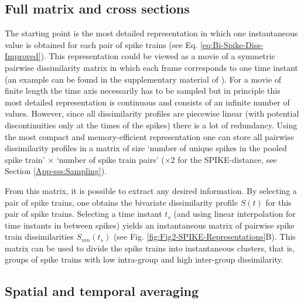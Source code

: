 \documentclass[10pt,twocolumn]{elsart5p}
\begin{document}
%

\subsection{\label{ss:Full-matrix-and-cross-sections} Full matrix and cross sections}

The starting point is the most detailed representation in which one instantaneous value is obtained for each pair of spike trains (see Eq. \ref{eq:Bi-Spike-Diss-Improved}). This representation could be viewed as a movie of a symmetric pairwise dissimilarity matrix in which each frame corresponds to one time instant (an example can be found in the supplementary material of \citep{Kreuz13}). For a movie of finite length the time axis necessarily has to be sampled but in principle this most detailed representation is continuous and consists of an infinite number of values. However, since all dissimilarity profiles are piecewise linear (with potential discontinuities only at the times of the spikes) there is a lot of redundancy. Using the most compact and memory-efficient representation one can store all pairwise dissimilarity profiles in a matrix of size `number of unique spikes in the pooled spike train' $\times$ `number of spike train pairs' ($\times 2$ for the SPIKE-distance, see Section \ref{App-sss:Sampling}).

From this matrix, it is possible to extract any desired information. By selecting a pair of spike trains, one obtains the bivariate dissimilarity profile $S (t)$ for this pair of spike trains. Selecting a time instant $t_s$ (and using linear interpolation for time instants in between spikes) yields an instantaneous matrix of pairwise spike train dissimilarities $S_{mn}(t_s)$ (see Fig. \ref{fig:Fig2-SPIKE-Representations}B). This matrix can be used to divide the spike trains into instantaneous clusters, that is, groups of spike trains with low intra-group and high inter-group dissimilarity.

\subsection{\label{ss:Spatial-and-temporal-Averaging} Spatial and temporal averaging}
\end{document}
